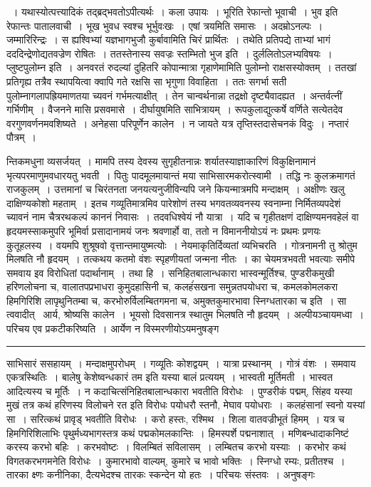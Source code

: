 \documentclass[11pt, openany]{book}
\begin{document}
\noindent
{~। यथास्योत्पत्त्यादिकं तद्ब्रद्भवतोऽपीत्यर्थः~। कला उपायः~। भूरिति रेफान्तो भूवाची~। भुव इति रेफान्तः पातालवाची~। भूख भुवध स्वश्च भूर्भुवःखः~। एषां त्रयमिति समासः~। अदम्रोऽनल्पः~। जम्मारिरिन्द्रः~। स ह्यश्विभ्यां यज्ञभागभुजौ कुर्बावामिति चिरं प्रार्थितः~। तथेति प्रतिपद्ये ताभ्यां भागं दददिन्द्रेणोद्यतवज्रेण रोषितः~। ततस्तेनास्य सवज्रः स्तम्भितो भुज इति~। दुर्ललितोऽलभ्यविषयः~। {\qtt प्लुष्टपुलोम्न इति}~। अनवरतं रुदल्यां दुहितरि कोपान्मात्रा गृहाणेमामिति पुलोम्नो राक्षसस्योक्तम्~। ततखां प्रतिगृह्य तत्रैव स्थापयित्वा क्वापि गते रक्षसि सा भृगुणा विवाहिता~। ततः सगर्भा सती पुलोम्नागलापह्रियमाणतया च्यवनं गर्भमत्याक्षीत्~। तेन चान्वर्थनान्ना तद्रक्षो दृष्ट्यैवादह्यत~। अन्तर्वत्नीं गर्भिणीम्~। वैजनने मासि प्रसवमासे~। दीर्घायुषमिति साभित्रायम्~। रूपकुलाद्युत्कर्षे वर्णिते सत्येतदेव वरगुणवर्णनमवशिष्यते~। अनेहसा परिपूर्णेन कालेन~। {\qt न जायते यत्र तृप्तिस्तदासेचनकं विदुः}~। नप्तारं पौत्रम्~।}

\newpage

\noindent
न्तिकमधुना व्यसर्जयत्~। मामपि तस्य देवस्य सुगृहीतनान्नः शर्यातस्याज्ञाकारिणं विकुक्षिनामानं भृत्यपरमाणुमवधारयतु भवती~। पितुः पादमूलमायान्तं मया साभिसारमकरोत्स्वामी~। तद्धि नः कुलक्रमागतं राजकुलम्~। उत्तमानां च चिरंतनता जनयत्यनुजीविन्यपि जने कियन्मात्रमपि मन्दाक्षम्~। अक्षीणः खलु दाक्षिण्यकोशो महताम्~। इतच गव्यूतिमात्रमिव पारेशोणं तस्य भगवतव्यवनस्य स्वनाम्ना निर्मितव्यपदेशं च्यावनं नाम चैत्ररथकल्पं काननं निवासः~। तदवधिश्वेयं नौ यात्रा~। यदि च गृहीतक्षणं दाक्षिण्यमनवहेलं वा हृदयमस्साकमुपरि भूमिर्वा प्रसादानामयं जनः श्रवणार्हो वा, ततो न विमाननीयोऽयं नः प्रथमः प्रणयः कुतूहलस्य~। वयमपि शुश्रूषवो वृत्तान्तमायुष्मत्योः~। नेयमाकृतिर्दिव्यतां व्यभिचरति~। गोत्रनामनी तु श्रोतुम मिलषति नौ हृदयम्~। तत्कथय कतमो वंशः स्पृहणीयतां जन्मना नीतः~। का चेयमत्रभवती भवत्याः समीपे समवाय इव विरोधितां पदार्थानाम्~। तथा हि~। सनिहितबालान्धकारा भास्वन्मूर्तिश्च, पुण्डरीकमुखी हरिणलोचना च, वालातपप्रभाधरा कुमुदहासिनी च, कलहंंसखना समुन्नतपयोधरा च, कमलकोमलकरा हिमगिरिशि लापृथुनितम्बा च, करभोरुर्विलम्बितगमना च, अमुक्तकुमारभावा स्निग्धतारका च इति~। सा त्ववादीत् \textendash\ आर्य, श्रोष्यसि कालेन~। भूयसो दिवसानत्र स्थातुम भिलषति नौ हृदयम्~। अल्पीयञ्चायमध्वा~। परिचय एव प्रकटीकरिष्यति~। आर्येण न विस्मरणीयोऽयमनुषङ्ग\textendash

\vspace{2mm}
\hrule

\noindent
{\s साभिसारं ससहायम्~। मन्दाक्षमुपरोधम्~। गव्यूतिः कोशद्वयम्~। यात्रा प्रस्थानम्~। गोत्रं वंशः~। समवाय एकत्रस्थितिः~। बालेषु केशेष्वन्धकारं तम इति यस्या बालं प्रत्ययम्~। भास्वती मूर्तिमती~। भास्वत आदित्यस्य च मूर्तिः~। न कदाचित्संनिहितबालान्धकारा भवतीति विरोधः~। पुण्डरीकं पद्मम्, सिंहव यस्या मुखं तत्र कथं हरिणस्य विलोचने रत इति विरोधः पयोधरौ स्तनौ, मेघाव पयोधराः~। कलहंसानां स्वनो यस्यां सा~। सरित्कथं प्रावृड् भवतीति विरोधः~। करो हस्तः, रश्मिथ~। शिला वातवज्रीभूतं हिमम्~। यत्र च हिमगिरिशिलाभिः पृथुर्मध्यभागस्तत्र कथं पद्मकोमलकान्तिः~। हिमस्पर्शे पद्मनाशात्~। {\qt मणिबन्धादाकनिष्टं करस्य करभो बहिः}~। करभवोष्टः~। विलम्बितं सविलासम्~। लम्बितच करभो यस्याः~। करभोर कथं विगतकरभगमनेति विरोधः~। कुमारभावो वाल्यम्, कुमारे च भावो भक्तिः~। स्निग्धो रम्यः, प्रतीतश्च~। तारका क्ष्णः कनीनिका, दैत्यभेदश्च तारकः स्कन्देन यो हतः~। परिचयः संस्तवः~। अनुषङ्गः}
\end{document}
